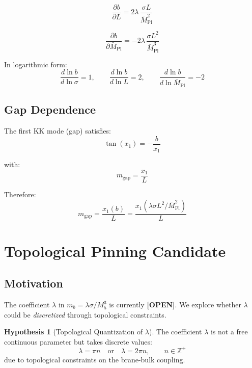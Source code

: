 \documentclass[11pt,a4paper]{article}
\newcommand{\Mpl}{\bar{M}_{\mathrm{Pl}}}
\newcommand{\Mfive}{M_5}
\newcommand{\mgap}{m_{\mathrm{gap}}}
\newcommand{\mb}{m_b}
\newcommand{\tagOPEN}{\textbf{[OPEN]}}
\theoremstyle{definition}
\newtheorem{hypothesis}{Hypothesis}[section]
\theoremstyle{plain}
\theoremstyle{remark}
\begin{document}
\begin{equation}
\frac{\partial b}{\partial L} = 2\lambda \, \frac{\sigma L}{\Mpl^2}
\label{eq:db-dL}
\end{equation}

\begin{equation}
\frac{\partial b}{\partial \Mpl} = -2\lambda \, \frac{\sigma L^2}{\Mpl^3}
\label{eq:db-dMpl}
\end{equation}

In logarithmic form:
\begin{equation}
\frac{d\ln b}{d\ln \sigma} = 1, \qquad \frac{d\ln b}{d\ln L} = 2, \qquad \frac{d\ln b}{d\ln \Mpl} = -2
\label{eq:log-derivatives}
\end{equation}

\subsection{Gap Dependence}

The first KK mode (gap) satisfies:
\begin{equation}
\tan(x_1) = -\frac{b}{x_1}
\label{eq:gap-eq}
\end{equation}

with:
\begin{equation}
\mgap = \frac{x_1}{L}
\label{eq:gap-from-x1}
\end{equation}

Therefore:
\begin{equation}
\mgap = \frac{x_1(b)}{L} = \frac{x_1(\lambda\sigma L^2/\Mpl^2)}{L}
\label{eq:gap-functional}
\end{equation}

\section{Topological Pinning Candidate}
\label{sec:pinning}

\subsection{Motivation}

The coefficient $\lambda$ in $\mb = \lambda\sigma/\Mfive^3$ is currently \tagOPEN{}.
We explore whether $\lambda$ could be \emph{discretized} through topological constraints.

\begin{hypothesis}[Topological Quantization of $\lambda$]
\label{hyp:quantized-lambda}
The coefficient $\lambda$ is not a free continuous parameter but takes discrete values:
\begin{equation}
\lambda = \pi n \quad \text{or} \quad \lambda = 2\pi n, \qquad n \in \mathbb{Z}^+
\label{eq:lambda-quantized}
\end{equation}
due to topological constraints on the brane-bulk coupling.
\end{hypothesis}
\end{document}
